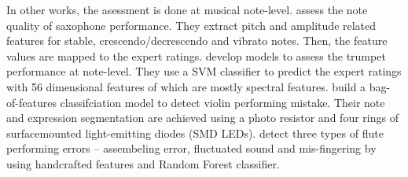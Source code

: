 In other works, the asessment is done at musical note-level.  assess the note quality of saxophone performance. They extract pitch and amplitude related features for stable, crescendo/decrescendo and vibrato notes. Then, the feature values are mapped to the expert ratings.  develop models to assess the trumpet performance at note-level. They use a \gls{SVM} classifier to predict the expert ratings with 56 dimensional features of which are mostly spectral features.  build a bag-of-features classifciation model to detect violin performing mistake. Their note and expression segmentation are achieved using a photo resistor and four rings of surfacemounted light-emitting diodes (SMD LEDs).  detect three types of flute performing errors -- assembeling error, fluctuated sound and mis-fingering by using handcrafted features and Random Forest classifier.

